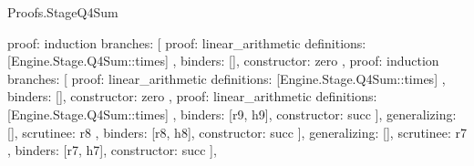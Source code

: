 \begin{lexlean}{Proofs.StageQ4Sum}
\begin{semanticmodule}
{{{{{{{{{{{{{{{                                            proof: induction{
                                              branches: [
                                                {
                                                  proof: linear_arithmetic{
                                                    definitions: [Engine.Stage.Q4Sum::times]
                                                  },
                                                  binders: [],
                                                  constructor: zero
                                                },
                                                {
                                                  proof: induction{
                                                    branches: [
                                                      {
                                                        proof: linear_arithmetic{
                                                          definitions: [Engine.Stage.Q4Sum::times]
                                                        },
                                                        binders: [],
                                                        constructor: zero
                                                      },
                                                      {
                                                        proof: linear_arithmetic{
                                                          definitions: [Engine.Stage.Q4Sum::times]
                                                        },
                                                        binders: [r9, h9],
                                                        constructor: succ
                                                      }
                                                    ],
                                                    generalizing: [],
                                                    scrutinee: r8
                                                  },
                                                  binders: [r8, h8],
                                                  constructor: succ
                                                }
                                              ],
                                              generalizing: [],
                                              scrutinee: r7
                                            },
                                            binders: [r7, h7],
                                            constructor: succ
                                          }
                                        ],
}}}}}}}}}}}}}}
\end{semanticmodule}
\end{lexlean}
